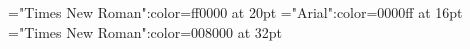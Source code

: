 \documentclass[a4paper]{article}
\begin{document}
\pagestyle{plain}
\sloppy
\setlength{\parfillskip}{0pt plus 1fil}
\font\ta="Times New Roman":color=ff0000 at 20pt
\font\tbta="Arial":color=0000ff at 16pt
\font\tctbta="Times New Roman":color=008000 at 32pt

\pagestyle{fancy} 
\renewcommand{\baselinestretch}{1.5} 





\end{document}
